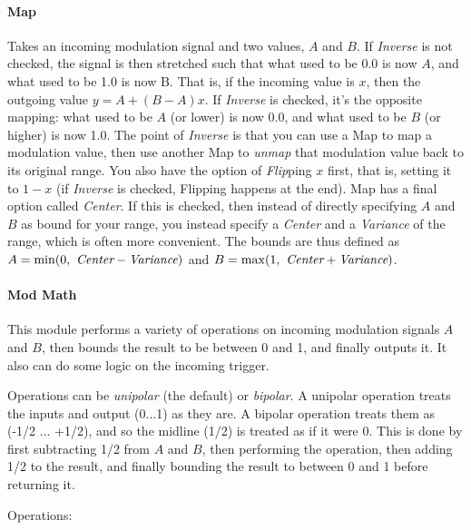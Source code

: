 \documentclass{article}
\begin{document}
\paragraph{Map}  Takes an incoming modulation signal and two values, \(A\) and \(B\).  If {\it Inverse} is not checked, the signal is then stretched such that what used to be 0.0 is now \(A\), and what used to be 1.0 is now B.  That is, if the incoming value is \(x\), then the outgoing value \(y = A + (B - A)x\).  If {\it Inverse} is checked, it's the opposite mapping: what used to be \(A\) (or lower) is now 0.0, and what used to be \(B\) (or higher) is now 1.0.  The point of {\it Inverse} is that you can use a Map to map a modulation value, then use another Map to {\it unmap} that modulation value back to its original range.  You also have the option of {\it Flip}ping \(x\) first, that is, setting it to \(1-x\) (if {\it Inverse} is checked, Flipping happens at the end).  Map has a final option called {\it Center}.  If this is checked, then instead of directly specifying \(A\) and \(B\) as bound for your range, you instead specify a {\it Center} and a {\it Variance} of the range, which is often more convenient.  The bounds are thus defined as \(A = \min(0,\ \text{\it Center} - \text{\it Variance})\) and \(B = \max(1,\ \text{\it Center} + \text{\it Variance})\).

\paragraph{Mod Math}  This module performs a variety of operations on incoming modulation signals \(A\) and \(B\), then bounds the result to be between 0 and 1, and finally outputs it.  It also can do some logic on the incoming trigger.  

Operations can be {\it unipolar} (the default) or {\it bipolar}.   A unipolar operation treats the inputs and output (0...1) as they are.  A bipolar operation treats them as (-1/2 ... +1/2), and so the midline (1/2) is treated as if it were 0.  This is done by first subtracting 1/2 from \(A\) and \(B\), then performing the operation, then adding 1/2 to the result, and finally bounding the result to between 0 and 1 before returning it.

Operations:
\end{document}
